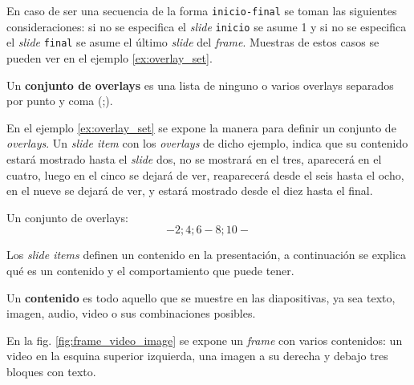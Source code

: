  		En caso de ser una secuencia de la forma \texttt{inicio-final} se toman las siguientes consideraciones: si no se especifica el \textit{slide} \texttt{inicio} se asume 1 y si no se especifica el \textit{slide} \texttt{final} se asume el último \textit{slide} del \textit{frame}. Muestras de estos casos se pueden ver en el ejemplo \ref{ex:overlay_set}. 		

 		\begin{definition}
 		\label{def:ovaerlay_set}
 			Un \textbf{conjunto de \textnormal{\textbf{overlays}}} es una lista de ninguno o varios \textnormal{overlays} separados por punto y coma (;).
 		\end{definition} 


		En el ejemplo \ref{ex:overlay_set} se expone la manera para definir un conjunto de \textit{overlays}. Un \textit{slide item} con los \textit{overlays} de dicho ejemplo, indica que su contenido estará mostrado hasta el \textit{slide} dos, no se mostrará en el tres, aparecerá en el cuatro, luego en el cinco se dejará de ver, reaparecerá desde el seis hasta el ocho, en el nueve se dejará de ver, y estará mostrado desde el diez hasta el final.  	

 		\begin{example}
 		\label{ex:overlay_set}
 			Un conjunto de \textnormal{overlays}:
 			$$-2; 4; 6-8; 10-$$
 		\end{example}	

					
		Los \textit{slide items} definen un contenido en la presentación, a continuación se explica qué es un contenido y el comportamiento que puede tener.
		\begin{definition}
		\label{def:content}
			Un \textbf{contenido} es todo aquello que se muestre en las diapositivas, ya sea texto, imagen, audio, video o sus combinaciones posibles. 
		\end{definition}


		En la fig. \ref{fig:frame_video_image} se expone un \textit{frame} con varios contenidos: un video en la esquina superior izquierda, una imagen a su derecha y debajo tres bloques con texto.


